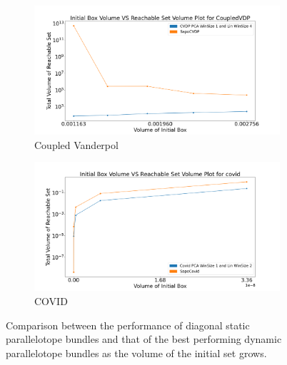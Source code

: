 \begin{figure}[h!]
    \hspace{-1.5em}
    \begin{subfigure}{0.5\textwidth}
    \centering
    \includegraphics[width=1.1\textwidth, height=0.75\textwidth]{figures/InitVolVSReachVol/CVDPInitReachVol.png}
    \caption{Coupled Vanderpol}
    \end{subfigure}%
    \begin{subfigure}{0.5\textwidth}
    \centering
    \includegraphics[width=1.1\textwidth, height=0.75\textwidth]{figures/InitVolVSReachVol/CovidInitReachVol.png}
    \caption{COVID}
    \end{subfigure}

    \caption{Comparison between the performance of diagonal static parallelotope bundles and that of the best performing dynamic parallelotope bundles as the volume of the initial set grows.}
    \label{fig:InitVolReachComp}
\end{figure}
\clearpage

